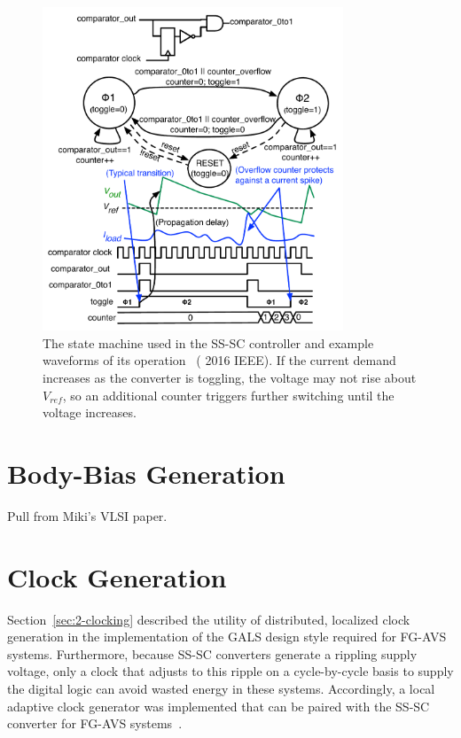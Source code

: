 \documentclass[graybox]{svmult}
\begin{document}
\begin{figure}
  \centering
  \includegraphics[width=0.8\textwidth]{3-dcdc-state-machine}
  \caption{The state machine used in the SS-SC controller and example waveforms of its operation~\cite{Zimmer2016} ({\textcopyright} 2016 IEEE).  If the current demand increases as the converter is toggling, the voltage may not rise about $V_{ref}$, so an additional counter triggers further switching until the voltage increases.}
  \label{fig:3-dcdc-state-machine}
\end{figure}

\section{Body-Bias Generation}
Pull from Miki's VLSI paper.

\section{Clock Generation}

Section~\ref{sec:2-clocking} described the utility of distributed, localized clock generation in the implementation of the GALS design style required for FG-AVS systems.
Furthermore, because SS-SC converters generate a rippling supply voltage, only a clock that adjusts to this ripple on a cycle-by-cycle basis to supply the digital logic can avoid wasted energy in these systems.
Accordingly, a local adaptive clock generator was implemented that can be paired with the SS-SC converter for FG-AVS systems~\cite{Keller2017}.
\end{document}
